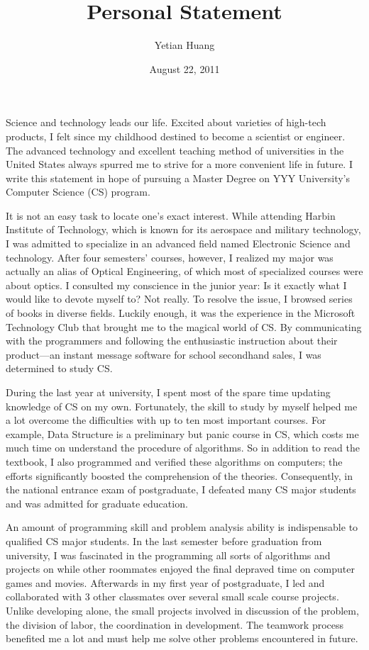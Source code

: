 \documentclass[a4paper]{article}
\author{Yetian Huang}
\title{Personal Statement}
\date{August 22, 2011}
\begin{document}
\maketitle
Science and technology leads our life. Excited about varieties of
high-tech products, I felt since my childhood destined to become a
scientist or engineer. The advanced technology and excellent teaching
method of universities in the United States always spurred me to strive for
a more convenient life in future. I write this statement in hope of pursuing a
Master Degree on YYY University's Computer Science (CS) program. 

It is not an easy task to locate one's exact interest. While attending
Harbin Institute of Technology, which is known for its aerospace and
military technology, I was admitted to specialize in an advanced field
named Electronic Science and technology. After four semesters'
courses, however, I realized my major was actually an alias of Optical
Engineering, of which most of specialized courses were about optics. I
consulted my conscience in the junior year: Is it exactly what I would
like to devote myself to? Not really. To resolve the issue, I 
browsed series of books in diverse fields. Luckily enough, it was the
experience in the Microsoft Technology Club that brought me to the
magical world of CS. By communicating with the programmers and following the
enthusiastic instruction about their product---an instant
message software for school secondhand sales, I was 
determined to study CS. 

During the last year at university, I spent most of the spare time
updating knowledge of CS on my own. Fortunately, the skill to study by
myself helped me a lot overcome the difficulties with up to ten most
important courses. For example, Data Structure is a preliminary but
panic course in CS, which costs me much time on understand the
procedure of algorithms. So in addition to read the textbook, I also
programmed and verified these algorithms on computers; the efforts
significantly boosted the comprehension of the theories. Consequently,
in the national entrance exam of postgraduate, I defeated many CS
major students and was admitted for graduate education.

An amount of programming skill and problem analysis ability is
indispensable to qualified CS major students. In the last semester
before graduation from university, I was fascinated in the programming
all sorts of algorithms and projects on while other roommates enjoyed
the final depraved time on computer games and movies. Afterwards in my
first year of postgraduate, I led and collaborated with 3 other
classmates over several small scale course projects. Unlike developing
alone, the small projects involved in discussion of the problem, the
division of labor, the coordination in development. The teamwork
process benefited me a lot and must help me solve other problems
encountered in future. 
\end{document}
